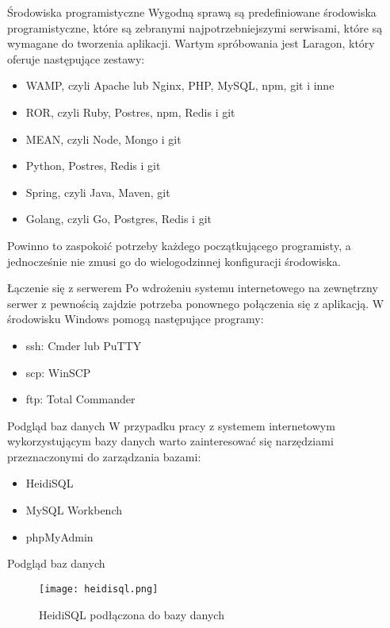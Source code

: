 \begin{frame}{Środowiska programistyczne}
	Wygodną sprawą są predefiniowane środowiska programistyczne, które są zebranymi najpotrzebniejszymi serwisami, które są wymagane do tworzenia aplikacji. Wartym spróbowania jest Laragon, który oferuje następujące zestawy:
	\begin{itemize}
		\item WAMP, czyli Apache lub Nginx, PHP, MySQL, npm, git i inne
		\item ROR, czyli Ruby, Postres, npm, Redis i git
		\item MEAN, czyli Node, Mongo i git
		\item Python, Postres, Redis i git
		\item Spring, czyli Java, Maven, git
		\item Golang, czyli Go, Postgres, Redis i git
	\end{itemize}
	
	Powinno to zaspokoić potrzeby każdego początkującego programisty, a jednocześnie nie zmusi go do wielogodzinnej konfiguracji środowiska.
\end{frame}

\begin{frame}{Łączenie się z serwerem}
	Po wdrożeniu systemu internetowego na zewnętrzny serwer z pewnością zajdzie potrzeba ponownego połączenia się z aplikacją. W środowisku Windows pomogą następujące programy:
	\begin{itemize}
		\item ssh: Cmder lub PuTTY
		\item scp: WinSCP
		\item ftp: Total Commander
	\end{itemize}
\end{frame}

\begin{frame}{Podgląd baz danych}
	W przypadku pracy z systemem internetowym wykorzystującym bazy danych warto zainteresować się narzędziami przeznaczonymi do zarządzania bazami:
	\begin{itemize}
		\item HeidiSQL
		\item MySQL Workbench
		\item phpMyAdmin
	\end{itemize}
\end{frame}

\begin{frame}{Podgląd baz danych}
	\begin{figure}[t]
		\centering
		\texttt{[image: heidisql.png]}
		\caption{HeidiSQL podłączona do bazy danych}
	\end{figure}
\end{frame}

